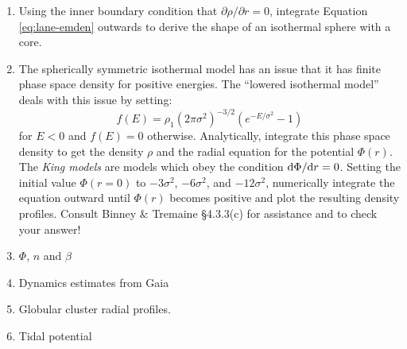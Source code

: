 \begin{enumerate}
\item Using the inner boundary condition that $\partial\rho/\partial
r=0$, integrate Equation \ref{eq:lane-emden} outwards to derive the
shape of an isothermal sphere with a core.
\item The spherically symmetric
isothermal model has an issue that it has finite phase space
density for positive energies. The ``lowered isothermal model'' deals
with this issue by setting:
\begin{equation}
f(E) = \rho_1 \left(2\pi \sigma^2\right)^{-3/2} \left( e^{-E/\sigma^2}
- 1\right)
\end{equation}
for $E<0$ and $f(E) = 0$ otherwise. Analytically, integrate this phase
space density to get the density $\rho$ and the radial equation for
the potential $\Phi(r)$. The {\it King models} are models which obey
the condition ${\rm d}\Phi/{\rm d}r=0$. Setting the initial value
$\Phi(r=0)$ to $-3\sigma^2$, $-6\sigma^2$, and $-12\sigma^2$,
numerically integrate the equation outward until $\Phi(r)$ becomes
positive and plot the resulting density profiles. Consult Binney \&
Tremaine \S4.3.3(c) for assistance and to check your answer!
\item $\Phi$, $n$ and $\beta$
\item Dynamics estimates from Gaia
\item Globular cluster radial profiles.
\item Tidal potential
\end{enumerate}


  
